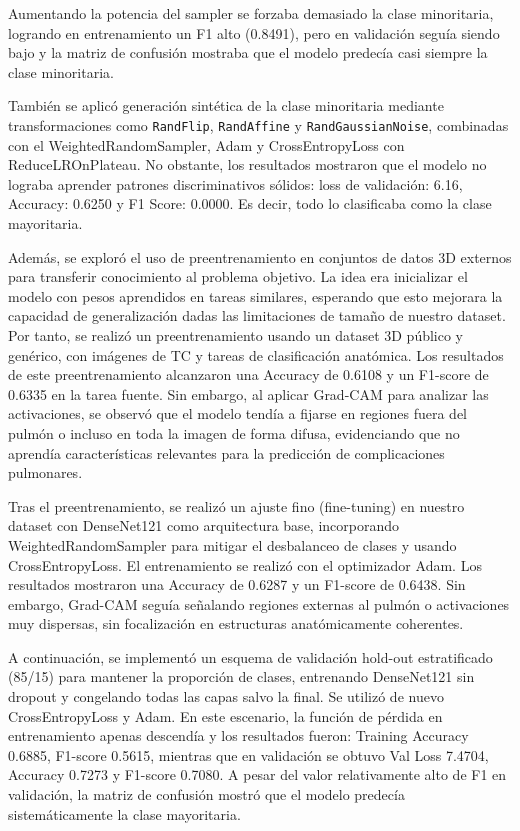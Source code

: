 Aumentando la potencia del sampler se forzaba demasiado la clase minoritaria, logrando en entrenamiento un F1 alto (0.8491), pero en validación seguía siendo bajo y la matriz de confusión mostraba que el modelo predecía casi siempre la clase minoritaria. 

También se aplicó generación sintética de la clase minoritaria mediante transformaciones como \texttt{RandFlip}, \texttt{RandAffine} y \texttt{RandGaussianNoise}, combinadas con el WeightedRandomSampler, Adam y CrossEntropyLoss con ReduceLROnPlateau. No obstante, los resultados mostraron que el modelo no lograba aprender patrones discriminativos sólidos: loss de validación: 6.16, Accuracy: 0.6250 y F1 Score: 0.0000. Es decir, todo lo clasificaba como la clase mayoritaria. 

Además, se exploró el uso de preentrenamiento en conjuntos de datos 3D externos para transferir conocimiento al problema objetivo. La idea era inicializar el modelo con pesos aprendidos en tareas similares, esperando que esto mejorara la capacidad de generalización dadas las limitaciones de tamaño de nuestro dataset. Por tanto, se realizó un preentrenamiento usando un dataset 3D público y genérico, con imágenes de TC y tareas de clasificación anatómica. Los resultados de este preentrenamiento alcanzaron una Accuracy de 0.6108 y un F1-score de 0.6335 en la tarea fuente. Sin embargo, al aplicar Grad-CAM para analizar las activaciones, se observó que el modelo tendía a fijarse en regiones fuera del pulmón o incluso en toda la imagen de forma difusa, evidenciando que no aprendía características relevantes para la predicción de complicaciones pulmonares.

Tras el preentrenamiento, se realizó un ajuste fino (fine-tuning) en nuestro dataset con DenseNet121 como arquitectura base, incorporando WeightedRandomSampler para mitigar el desbalanceo de clases y usando CrossEntropyLoss. El entrenamiento se realizó con el optimizador Adam. Los resultados mostraron una Accuracy de 0.6287 y un F1-score de 0.6438. Sin embargo, Grad-CAM seguía señalando regiones externas al pulmón o activaciones muy dispersas, sin focalización en estructuras anatómicamente coherentes.

A continuación, se implementó un esquema de validación hold-out estratificado (85/15) para mantener la proporción de clases, entrenando DenseNet121 sin dropout y congelando todas las capas salvo la final. Se utilizó de nuevo CrossEntropyLoss y Adam. En este escenario, la función de pérdida en entrenamiento apenas descendía y los resultados fueron: Training Accuracy 0.6885, F1-score 0.5615, mientras que en validación se obtuvo Val Loss 7.4704, Accuracy 0.7273 y F1-score 0.7080. A pesar del valor relativamente alto de F1 en validación, la matriz de confusión mostró que el modelo predecía sistemáticamente la clase mayoritaria.

